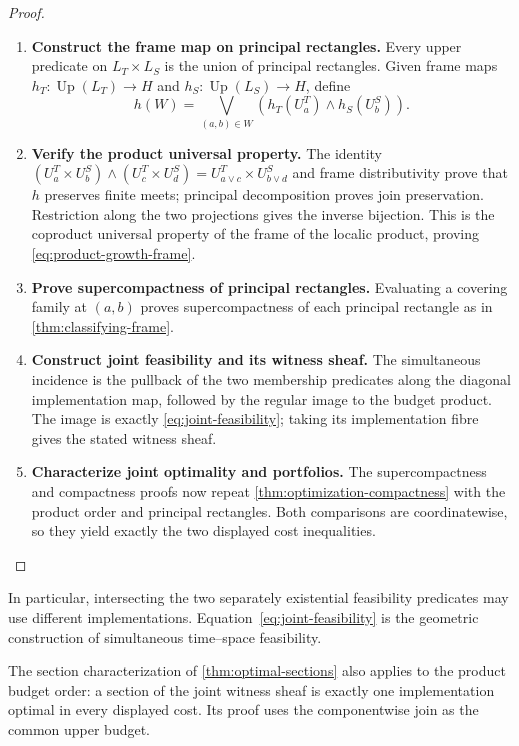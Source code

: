 \documentclass[11pt,a4paper]{article}
\numberwithin{algorithm}{section}
\numberwithin{equation}{section}
\theoremstyle{definition}
\theoremstyle{remark}
\theoremstyle{plain}
\newcommand{\Up}{\operatorname{Up}}
\theoremstyle{definition}
\theoremstyle{plain}
\begin{document}
\begin{proof}\leavevmode
\begin{enumerate}[leftmargin=*,align=left]
\item \textbf{Construct the frame map on principal rectangles.}
Every upper predicate on $L_T\times L_S$ is the union of
principal rectangles.  Given frame maps
$h_T:\Up(L_T)\to H$ and $h_S:\Up(L_S)\to H$, define
\[
 h(W)=\bigvee_{(a,b)\in W}
          (h_T(U_a^T)\wedge h_S(U_b^S)).
\]

\item \textbf{Verify the product universal property.}
The identity
$(U_a^T\times U_b^S)\wedge(U_c^T\times U_d^S)
 =U_{a\vee c}^T\times U_{b\vee d}^S$
and frame distributivity prove that $h$ preserves finite
meets; principal decomposition proves join preservation.
Restriction along the two projections gives the inverse
bijection.  This is the coproduct universal property of the
frame of the localic product, proving
\eqref{eq:product-growth-frame}.

\item \textbf{Prove supercompactness of principal rectangles.}
Evaluating a covering
family at $(a,b)$ proves supercompactness of each principal
rectangle as in \cref{thm:classifying-frame}.

\item \textbf{Construct joint feasibility and its witness sheaf.}
The simultaneous incidence is the pullback of the two
membership predicates along the diagonal implementation
map, followed by the regular image to the budget product.
The image is exactly \eqref{eq:joint-feasibility}; taking
its implementation fibre gives the stated witness sheaf.

\item \textbf{Characterize joint optimality and portfolios.}
The supercompactness and compactness proofs now repeat
\cref{thm:optimization-compactness} with the product order
and principal rectangles.  Both comparisons are coordinatewise,
so they yield exactly the two displayed cost inequalities.
\end{enumerate}
\end{proof}

In particular, intersecting the two separately existential
feasibility predicates may use different implementations.
Equation~\eqref{eq:joint-feasibility} is the geometric
construction of simultaneous time--space feasibility.


The section characterization of \cref{thm:optimal-sections} also
applies to the product budget order: a section of the joint witness
sheaf is exactly one implementation optimal in every displayed cost.
Its proof uses the componentwise join as the common upper budget.
\end{document}
